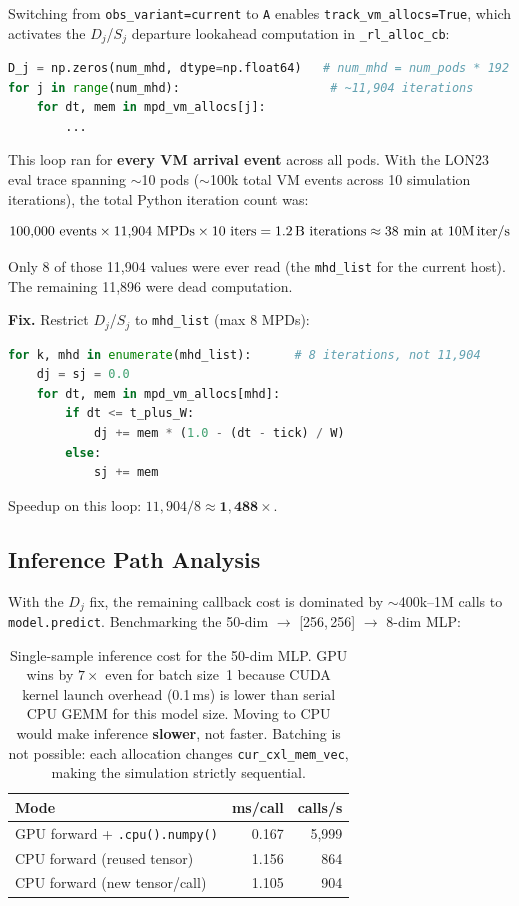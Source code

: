 \documentclass[11pt]{article}
\begin{document}
Switching from \texttt{obs\_variant=current} to \texttt{A} enables
\texttt{track\_vm\_allocs=True}, which activates the $D_j$/$S_j$ departure
lookahead computation in \texttt{\_rl\_alloc\_cb}:

\begin{lstlisting}[language=Python]
D_j = np.zeros(num_mhd, dtype=np.float64)   # num_mhd = num_pods * 192
for j in range(num_mhd):                     # ~11,904 iterations
    for dt, mem in mpd_vm_allocs[j]:
        ...
\end{lstlisting}

This loop ran for \textbf{every VM arrival event} across all pods.
With the LON23 eval trace spanning $\sim$10 pods
($\sim$100k total VM events across 10 simulation iterations),
the total Python iteration count was:

\[
100{,}000 \text{ events} \times 11{,}904 \text{ MPDs} \times 10 \text{ iters}
= 1.2\,\text{B iterations} \approx 38\text{ min at 10M\,iter/s}
\]

Only 8 of those 11,904 values were ever read (the \texttt{mhd\_list} for
the current host). The remaining 11,896 were dead computation.

\textbf{Fix.} Restrict $D_j$/$S_j$ to \texttt{mhd\_list} (max 8 MPDs):

\begin{lstlisting}[language=Python]
for k, mhd in enumerate(mhd_list):      # 8 iterations, not 11,904
    dj = sj = 0.0
    for dt, mem in mpd_vm_allocs[mhd]:
        if dt <= t_plus_W:
            dj += mem * (1.0 - (dt - tick) / W)
        else:
            sj += mem
\end{lstlisting}

Speedup on this loop: $11{,}904 / 8 \approx \mathbf{1{,}488\times}$.

\subsection{Inference Path Analysis}

With the $D_j$ fix, the remaining callback cost is dominated by
$\sim$400k--1M calls to \texttt{model.predict}.
Benchmarking the 50-dim $\to$ [256,\,256] $\to$ 8-dim MLP:

\begin{table}[h]
\centering
\begin{tabular}{lrr}
\toprule
Mode & ms/call & calls/s \\
\midrule
GPU forward + \texttt{.cpu().numpy()} & 0.167 & 5,999 \\
CPU forward (reused tensor)           & 1.156 & 864 \\
CPU forward (new tensor/call)         & 1.105 & 904 \\
\bottomrule
\end{tabular}
\caption{Single-sample inference cost for the 50-dim MLP.
GPU wins by $7\times$ even for batch size~1 because CUDA kernel launch
overhead (0.1\,ms) is lower than serial CPU GEMM for this model size.
Moving to CPU would make inference \textbf{slower}, not faster.
Batching is not possible: each allocation changes \texttt{cur\_cxl\_mem\_vec},
making the simulation strictly sequential.}
\end{table}
\end{document}
